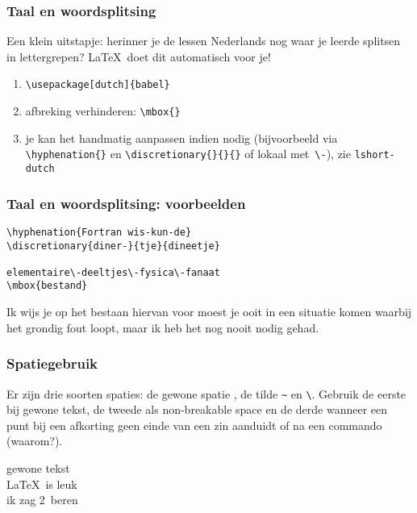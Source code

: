 \begin{frame}[fragile]
  \frametitle{Taal en woordsplitsing}

  Een klein uitstapje: herinner je de lessen Nederlands nog waar je leerde splitsen in lettergrepen? \LaTeX~doet dit automatisch voor je!

  \begin{enumerate}
    \item \texttt{\textcolor{uagreen}{\textbackslash usepackage}[dutch]\{babel\}}
    \item afbreking verhinderen: \texttt{\textcolor{uagreen}{\textbackslash mbox}\{\}}
    \item je kan het handmatig aanpassen indien nodig (bijvoorbeeld via \texttt{\textcolor{uagreen}{\textbackslash hyphenation}\{\}} en \texttt{\textcolor{uagreen}{\textbackslash discretionary}\{\}\{\}\{\}} of lokaal met~\verb|\-|), zie \texttt{lshort-dutch}
  \end{enumerate}
\end{frame}

\begin{frame}[fragile]
  \frametitle{Taal en woordsplitsing: voorbeelden}

  \begin{verbatim}
\hyphenation{Fortran wis-kun-de}
\discretionary{diner-}{tje}{dineetje}

elementaire\-deeltjes\-fysica\-fanaat
\mbox{bestand}
  \end{verbatim}
  Ik wijs je op het bestaan hiervan voor moest je ooit in een situatie komen waarbij het grondig fout loopt, maar ik heb het nog nooit nodig gehad.
\end{frame}


%
%

\begin{frame}[fragile]
  \frametitle{Spatiegebruik}

  Er zijn drie soorten spaties: de gewone spatie \texttt{\textvisiblespace}, de tilde \texttt{\~} en \texttt{\textbackslash\textvisiblespace}. Gebruik de eerste bij gewone tekst, de tweede als non-breakable space en de derde wanneer een punt bij een afkorting geen einde van een zin aanduidt of na een commando (waarom?).

\begin{LTXexample}
gewone tekst \\
\LaTeX\ is leuk \\
ik zag 2~beren
\end{LTXexample}
\end{frame}

